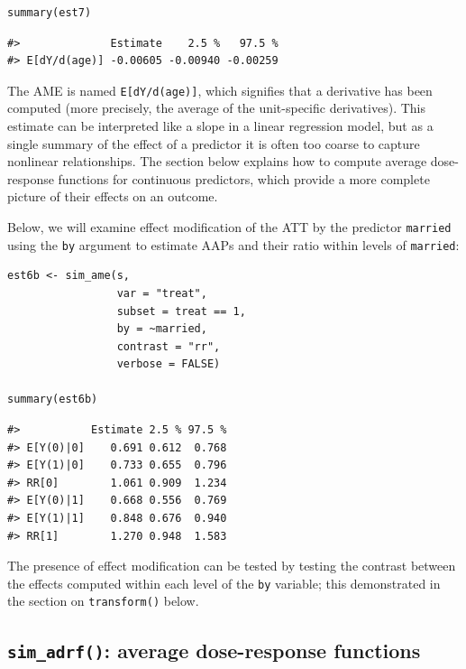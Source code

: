 \begin{verbatim}
summary(est7)
\end{verbatim}

\begin{verbatim}
#>              Estimate    2.5 %   97.5 %
#> E[dY/d(age)] -0.00605 -0.00940 -0.00259
\end{verbatim}

The AME is named \texttt{E{[}dY/d(age){]}}, which signifies that a derivative has been computed (more precisely, the average of the unit-specific derivatives). This estimate can be interpreted like a slope in a linear regression model, but as a single summary of the effect of a predictor it is often too coarse to capture nonlinear relationships. The section below explains how to compute average dose-response functions for continuous predictors, which provide a more complete picture of their effects on an outcome.

Below, we will examine effect modification of the ATT by the predictor \texttt{married} using the \texttt{by} argument to estimate AAPs and their ratio within levels of \texttt{married}:

\begin{verbatim}
est6b <- sim_ame(s,
                 var = "treat",
                 subset = treat == 1,
                 by = ~married,
                 contrast = "rr",
                 verbose = FALSE)

summary(est6b)
\end{verbatim}

\begin{verbatim}
#>           Estimate 2.5 % 97.5 %
#> E[Y(0)|0]    0.691 0.612  0.768
#> E[Y(1)|0]    0.733 0.655  0.796
#> RR[0]        1.061 0.909  1.234
#> E[Y(0)|1]    0.668 0.556  0.769
#> E[Y(1)|1]    0.848 0.676  0.940
#> RR[1]        1.270 0.948  1.583
\end{verbatim}

The presence of effect modification can be tested by testing the contrast between the effects computed within each level of the \texttt{by} variable; this demonstrated in the section on \texttt{transform()} below.

\hypertarget{sim_adrf-average-dose-response-functions}{%
\subsection{\texorpdfstring{\texttt{sim\_adrf()}: average dose-response functions}{sim\_adrf(): average dose-response functions}}\label{sim_adrf-average-dose-response-functions}}

